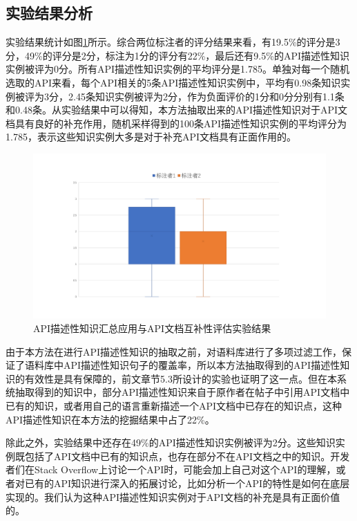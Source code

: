 \subsection{实验结果分析}
实验结果统计如图\ref{fig:fig3}所示。综合两位标注者的评分结果来看，有19.5\%的评分是3分，49\%的评分是2分，标注为1分的评分有22\%，最后还有9.5\%的API描述性知识实例被评为0分。所有API描述性知识实例的平均评分是1.785。单独对每一个随机选取的API来看，每个API相关的5条API描述性知识实例中，平均有0.98条知识实例被评为3分，2.45条知识实例被评为2分，作为负面评价的1分和0分分别有1.1条和0.48条。从实验结果中可以得知，本方法抽取出来的API描述性知识对于API文档具有良好的补充作用，随机采样得到的100条API描述性知识实例的平均评分为1.785，表示这些知识实例大多是对于补充API文档具有正面作用的。

\begin{figure}[htb]
    \centering
    \includegraphics[width=\textwidth]{image/5-2.pdf}
    \caption{API描述性知识汇总应用与API文档互补性评估实验结果} 
    \label{fig:fig3} 
\end{figure}

由于本方法在进行API描述性知识的抽取之前，对语料库进行了多项过滤工作，保证了语料库中API描述性知识句子的覆盖率，所以本方法抽取得到的API描述性知识的有效性是具有保障的，前文章节5.3所设计的实验也证明了这一点。但在本系统抽取得到的知识中，部分API描述性知识来自于原作者在帖子中引用API文档中已有的知识，或者用自己的语言重新描述一个API文档中已存在的知识点，这种API描述性知识在本方法的挖掘结果中占了22\%。

除此之外，实验结果中还存在49\%的API描述性知识实例被评为2分。这些知识实例既包括了API文档中已有的知识点，也存在部分不在API文档之中的知识。开发者们在Stack Overflow上讨论一个API时，可能会加上自己对这个API的理解，或者对已有的API知识进行深入的拓展讨论，比如分析一个API的特性是如何在底层实现的。我们认为这种API描述性知识实例对于API文档的补充是具有正面价值的。

